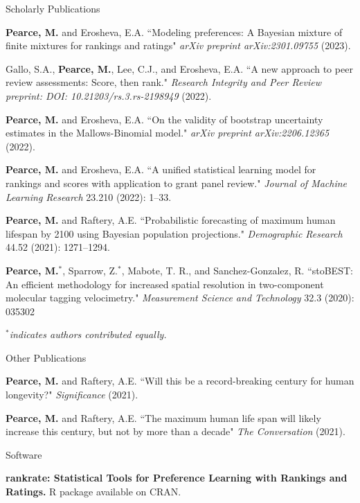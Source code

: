 \documentclass{resume} %
\begin{document}
\begin{rSection}{Scholarly Publications}

{\bf Pearce, M.} and Erosheva, E.A. ``Modeling preferences: A Bayesian mixture of finite mixtures for rankings and ratings" \textit{arXiv preprint arXiv:2301.09755} (2023).

Gallo, S.A., {\bf Pearce, M.}, Lee, C.J., and Erosheva, E.A. ``A new approach to peer review assessments: Score, then rank." \textit{Research Integrity and Peer Review preprint: DOI: 10.21203/rs.3.rs-2198949} (2022).

{\bf Pearce, M.} and Erosheva, E.A. ``On the validity of bootstrap uncertainty estimates in the Mallows-Binomial model." \textit{arXiv preprint arXiv:2206.12365} (2022).

{\bf Pearce, M.} and Erosheva, E.A. ``A unified statistical learning model for rankings and scores with application to grant panel review." \textit{Journal of Machine Learning Research} 23.210 (2022): 1--33.

{\bf Pearce, M.} and Raftery, A.E. ``Probabilistic forecasting of maximum human lifespan by 2100 using Bayesian population projections." {\em Demographic Research} 44.52 (2021): 1271--1294.

{\bf Pearce, M.}$^*$, Sparrow, Z.$^*$, Mabote, T. R., and Sanchez-Gonzalez, R. ``stoBEST: An efficient methodology for increased spatial resolution in two-component molecular tagging velocimetry." {\em Measurement Science and Technology} 32.3 (2020): 035302

{\em $^*$indicates authors contributed equally.}
\end{rSection}
\newpage

\begin{rSection}{Other Publications}

{\bf Pearce, M.} and Raftery, A.E. ``Will this be a record-breaking century for human longevity?" {\em Significance} (2021).

{\bf Pearce, M.} and Raftery, A.E. ``The maximum human life span will likely increase this century, but not by more than a decade" {\em The Conversation} (2021).

\end{rSection}

\begin{rSection}{Software}

{\bf rankrate: Statistical Tools for Preference Learning with Rankings and Ratings.} R package available on CRAN.

\end{rSection}
\end{document}
